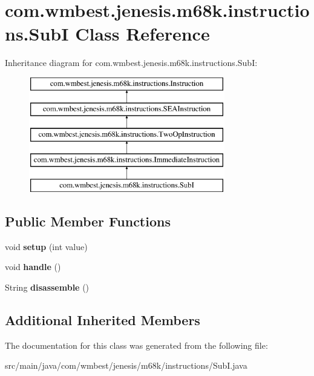 \hypertarget{classcom_1_1wmbest_1_1jenesis_1_1m68k_1_1instructions_1_1SubI}{\section{com.\-wmbest.\-jenesis.\-m68k.\-instructions.\-Sub\-I Class Reference}
\label{classcom_1_1wmbest_1_1jenesis_1_1m68k_1_1instructions_1_1SubI}
}
Inheritance diagram for com.\-wmbest.\-jenesis.\-m68k.\-instructions.\-Sub\-I\-:\begin{figure}[H]
\begin{center}
\leavevmode
\includegraphics[height=5.000000cm]{classcom_1_1wmbest_1_1jenesis_1_1m68k_1_1instructions_1_1SubI}
\end{center}
\end{figure}
\subsection*{Public Member Functions}
\begin{DoxyCompactItemize}
\item 
\hypertarget{classcom_1_1wmbest_1_1jenesis_1_1m68k_1_1instructions_1_1SubI_a3829cd067af96dc98b5d3a25a62ee5d8}{void {\bfseries setup} (int value)}\label{classcom_1_1wmbest_1_1jenesis_1_1m68k_1_1instructions_1_1SubI_a3829cd067af96dc98b5d3a25a62ee5d8}

\item 
\hypertarget{classcom_1_1wmbest_1_1jenesis_1_1m68k_1_1instructions_1_1SubI_afffd587b5bc8c58d3e78bbc889d359be}{void {\bfseries handle} ()}\label{classcom_1_1wmbest_1_1jenesis_1_1m68k_1_1instructions_1_1SubI_afffd587b5bc8c58d3e78bbc889d359be}

\item 
\hypertarget{classcom_1_1wmbest_1_1jenesis_1_1m68k_1_1instructions_1_1SubI_ad9049b3efd1457ba6527554fbf87be32}{String {\bfseries disassemble} ()}\label{classcom_1_1wmbest_1_1jenesis_1_1m68k_1_1instructions_1_1SubI_ad9049b3efd1457ba6527554fbf87be32}

\end{DoxyCompactItemize}
\subsection*{Additional Inherited Members}


The documentation for this class was generated from the following file\-:\begin{DoxyCompactItemize}
\item 
src/main/java/com/wmbest/jenesis/m68k/instructions/Sub\-I.\-java\end{DoxyCompactItemize}
